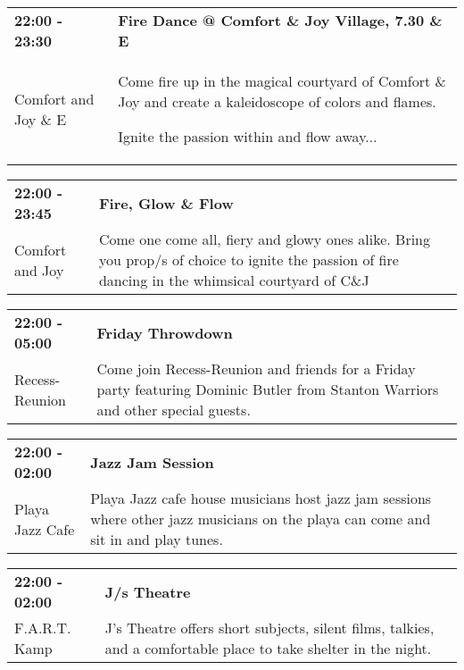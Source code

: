 \begin{tabular}{ p{1in} p{2.2in} }
    \textbf{22:00 - 23:30} & \textbf{Fire Dance @ Comfort \& Joy Village, 7.30 \& E} \\
    Comfort and Joy \newline 7.30 \& E & Come fire up in the magical courtyard of Comfort \& Joy and create a kaleidoscope of colors and flames. 

Ignite the passion within and flow away... \\
    \hline 
\end{tabular}
    
\begin{tabular}{ p{1in} p{2.2in} }
    \textbf{22:00 - 23:45} & \textbf{Fire, Glow \& Flow} \\
    Comfort and Joy \newline  & Come one come all, fiery and glowy ones alike. Bring you prop/s of choice to ignite the passion of fire dancing in the whimsical courtyard of C\&J \\
    \hline 
\end{tabular}
    
\begin{tabular}{ p{1in} p{2.2in} }
    \textbf{22:00 - 05:00} & \textbf{Friday Throwdown} \\
    Recess-Reunion \newline  & Come join Recess-Reunion and friends for a Friday party featuring Dominic Butler from Stanton Warriors and other special guests. \\
    \hline 
\end{tabular}
    
\begin{tabular}{ p{1in} p{2.2in} }
    \textbf{22:00 - 02:00} & \textbf{Jazz Jam Session} \\
    Playa Jazz Cafe \newline  & Playa Jazz cafe house musicians host jazz jam sessions where other jazz musicians on the playa can come and sit in and play tunes. \\
    \hline 
\end{tabular}
    
\begin{tabular}{ p{1in} p{2.2in} }
    \textbf{22:00 - 02:00} & \textbf{J/s Theatre} \\
    F.A.R.T. Kamp \newline  & J's Theatre offers short subjects, silent films, talkies, and a comfortable place to take shelter in the night. \\
    \hline 
\end{tabular}
    
